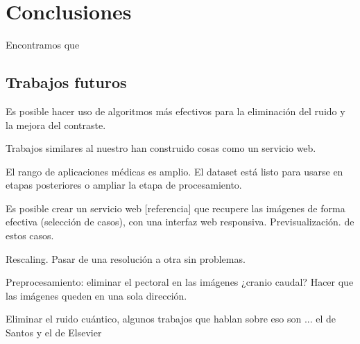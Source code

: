 \chapter{Conclusiones}

Encontramos que 

\section{Trabajos futuros}

Es posible hacer uso de algoritmos más efectivos para la eliminación del ruido y
la mejora del contraste. 

Trabajos similares al nuestro \cite{heath2000digital} han construido cosas como
un servicio web.

El rango de aplicaciones médicas es amplio. El dataset está listo para usarse
en etapas posteriores o ampliar la etapa de procesamiento.

Es posible crear un servicio web [referencia] que recupere las imágenes de
forma efectiva (selección de casos), con una interfaz web responsiva.
Previsualización. de estos casos.

Rescaling. Pasar de una resolución a otra sin problemas.

Preprocesamiento: eliminar el pectoral en las imágenes ¿cranio caudal?
Hacer que las imágenes queden en una sola dirección.

Eliminar el ruido cuántico, algunos trabajos que hablan sobre eso son ... el de
Santos y el de Elsevier

